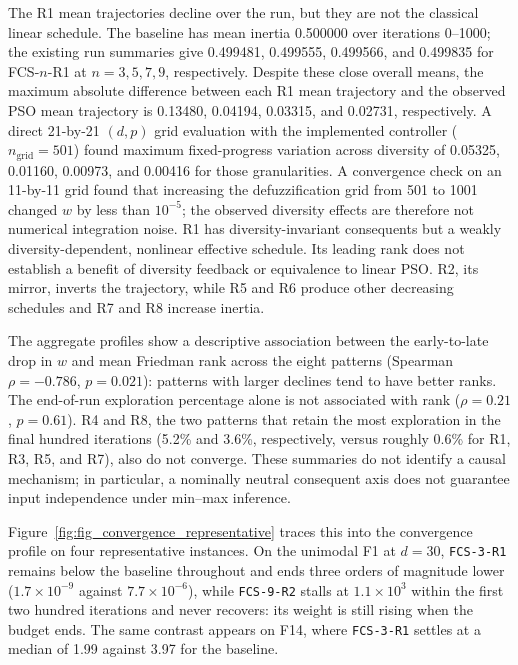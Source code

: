 The R1 mean trajectories decline over the run, but they are not the classical linear schedule. The baseline has mean inertia 0.500000 over iterations 0--1000; the existing run summaries give 0.499481, 0.499555, 0.499566, and 0.499835 for FCS-$n$-R1 at $n=3,5,7,9$, respectively. Despite these close overall means, the maximum absolute difference between each R1 mean trajectory and the observed PSO mean trajectory is 0.13480, 0.04194, 0.03315, and 0.02731, respectively. A direct 21-by-21 $(d,p)$ grid evaluation with the implemented controller ($n_{\mathrm{grid}}=501$) found maximum fixed-progress variation across diversity of 0.05325, 0.01160, 0.00973, and 0.00416 for those granularities. A convergence check on an 11-by-11 grid found that increasing the defuzzification grid from 501 to 1001 changed $w$ by less than $10^{-5}$; the observed diversity effects are therefore not numerical integration noise. R1 has diversity-invariant consequents but a weakly diversity-dependent, nonlinear effective schedule. Its leading rank does not establish a benefit of diversity feedback or equivalence to linear PSO. R2, its mirror, inverts the trajectory, while R5 and R6 produce other decreasing schedules and R7 and R8 increase inertia.

The aggregate profiles show a descriptive association between the early-to-late drop in $w$ and mean Friedman rank across the eight patterns (Spearman $\rho=-0.786$, $p=0.021$): patterns with larger declines tend to have better ranks. The end-of-run exploration percentage alone is not associated with rank ($\rho=0.21$, $p=0.61$). R4 and R8, the two patterns that retain the most exploration in the final hundred iterations (5.2\% and 3.6\%, respectively, versus roughly 0.6\% for R1, R3, R5, and R7), also do not converge. These summaries do not identify a causal mechanism; in particular, a nominally neutral consequent axis does not guarantee input independence under min--max inference.

Figure~\ref{fig:fig_convergence_representative} traces this into the convergence profile on four representative instances. On the unimodal F1 at $d=30$, \texttt{FCS-3-R1} remains below the baseline throughout and ends three orders of magnitude lower ($1.7 \times 10^{-9}$ against $7.7 \times 10^{-6}$), while \texttt{FCS-9-R2} stalls at $1.1 \times 10^{3}$ within the first two hundred iterations and never recovers: its weight is still rising when the budget ends. The same contrast appears on F14, where \texttt{FCS-3-R1} settles at a median of 1.99 against 3.97 for the baseline.

